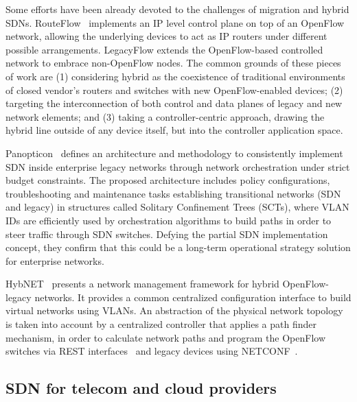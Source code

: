 Some efforts have been already devoted to the challenges of migration and hybrid SDNs. RouteFlow~\cite{rothenberg2012-1} implements an IP level control plane on top of an OpenFlow 
network, allowing the underlying devices to act as IP routers under different possible arrangements. LegacyFlow 
\cite{rothenberg2014} extends the OpenFlow-based controlled network to embrace non-OpenFlow nodes. The common 
grounds of these pieces of work are (1) considering hybrid as the coexistence of traditional environments of 
closed vendor's routers and switches with new OpenFlow-enabled devices; (2) targeting the interconnection of 
both control and data planes of legacy and new network elements; and (3) taking a controller-centric approach, 
drawing the hybrid line outside of any device itself, but into the controller application space.

Panopticon~\cite{levin2013} defines an architecture and methodology to consistently implement 
SDN inside enterprise legacy networks through network orchestration under strict budget constraints. The proposed 
architecture includes policy configurations, troubleshooting and maintenance tasks establishing transitional networks 
(SDN and legacy) in structures called Solitary Confinement Trees (SCTs), where VLAN IDs are efficiently used by 
orchestration algorithms to build paths in order to steer traffic through SDN switches. Defying the partial SDN 
implementation concept, they confirm that this could be a long-term operational strategy solution for enterprise 
networks.

HybNET~\cite{lu2013} presents a network management framework for
hybrid OpenFlow-legacy networks. It provides a common centralized
configuration interface to build virtual networks using VLANs. An
abstraction of the physical network topology is taken into account by
a centralized controller that applies a path finder mechanism, in
order to calculate network paths and program the OpenFlow switches via
REST interfaces~\cite{richardson2008restful} and legacy devices using NETCONF~\cite{enns2011-1}.

\subsection{SDN for telecom and cloud providers}

